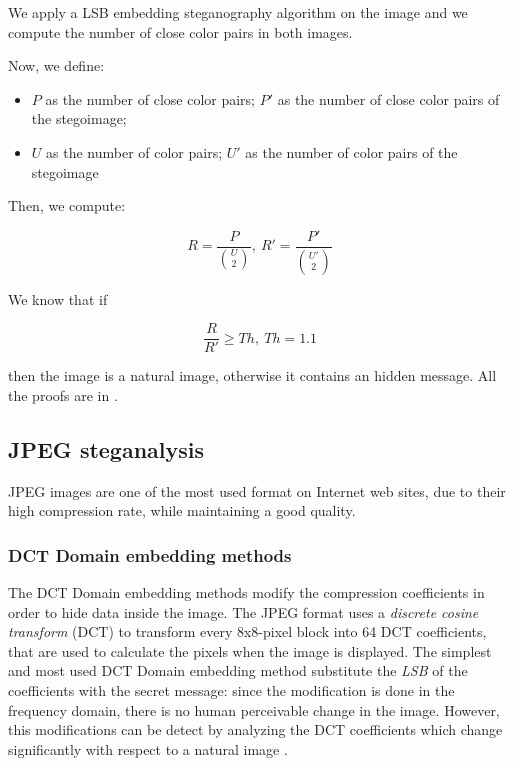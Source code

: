 \documentclass[../../main.tex]{subfiles}
\begin{document}
We apply a LSB embedding steganography algorithm on the image and we compute
the number of close color pairs in both images.

Now, we define:

\begin{itemize}[noitemsep]
    \item $P$ as the number of close color pairs; $P'$ as the number of
          close color pairs of the stegoimage;
    \item $U$ as the number of color pairs; $U'$ as the number of color
          pairs of the stegoimage
\end{itemize}

Then, we compute:

\[ R = \frac{P}{\binom{U}{2}},\ R' = \frac{P'}{\binom{U'}{2}} \]

We know that if

\[ \frac{R}{R'} \geq Th,\ Th = 1.1 \]

\noindent then the image is a natural image, otherwise it contains an hidden
message. All the proofs are in \cite{detecting-lsb-steganography}.

\subsection{JPEG steganalysis}
JPEG images are one of the most used format on Internet web sites, due to
their high compression rate, while maintaining a good quality.
\subsubsection{DCT Domain embedding methods}
The DCT Domain embedding methods modify the compression coefficients
in order to hide data inside the image.
The JPEG format uses a \emph{discrete cosine transform} (DCT) to transform
every 8x8-pixel block into 64 DCT coefficients, that are used to calculate
the pixels when the image is displayed.
The simplest and most used DCT Domain embedding method substitute the
\emph{LSB} of the coefficients with the secret message: since the
modification is done in the frequency domain, there is no human perceivable
change in the image.
However, this modifications can be detect by analyzing the DCT coefficients
which change significantly with respect to a natural image
\cite{jpeg-image-internet}.
\end{document}
